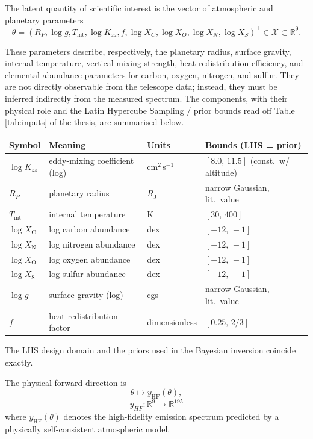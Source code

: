 \documentclass[11pt,a4paper]{article}
\newcommand{\Rp}{R_{\!P}}
\newcommand{\logg}{\log g}
\newcommand{\Tint}{T_{\mathrm{int}}}
\newcommand{\Kzz}{\log K_{zz}}
\newcommand{\fhr}{f}
\newcommand{\XC}{\log X_{\mathrm{C}}}
\newcommand{\XO}{\log X_{\mathrm{O}}}
\newcommand{\XN}{\log X_{\mathrm{N}}}
\newcommand{\XS}{\log X_{\mathrm{S}}}
\begin{document}
The latent quantity of scientific interest is the vector of atmospheric and planetary parameters
\[
\theta
=
\left(
R_P,\log g,T_{\mathrm{int}},\log K_{zz},f,
\log X_C,\log X_O,\log X_N,\log X_S
\right)^\top
\in \mathcal{X}\subset \mathbb{R}^9.
\]
\label{sec:what}



These parameters describe, respectively, the planetary radius, surface gravity, internal temperature, vertical mixing strength, heat redistribution efficiency, and elemental abundance parameters for carbon, oxygen, nitrogen, and sulfur. They are not directly observable from the telescope data; instead, they must be inferred indirectly from the measured spectrum. The components, with their physical role and the Latin Hypercube Sampling / prior bounds
read off Table \ref{tab:inputs} of the thesis, are summarised below.


\begin{center}
\label{tab:inputs}
\begin{tabular}{@{}l l l l@{}}
\toprule
Symbol & Meaning & Units & Bounds (LHS = prior)\\
\midrule
$\Kzz$   & eddy-mixing coefficient (log) & cm$^{2}$\,s$^{-1}$ & $[8.0,\,11.5]$ (const.\ w/ altitude)\\
$\Rp$    & planetary radius              & $R_{\mathrm{J}}$   & narrow Gaussian, lit.\ value\\
$\Tint$  & internal temperature          & K                  & $[30,\,400]$\\
$\XC$    & log carbon abundance          & dex                & $[-12,\,-1]$\\
$\XN$    & log nitrogen abundance        & dex                & $[-12,\,-1]$\\
$\XO$    & log oxygen abundance          & dex                & $[-12,\,-1]$\\
$\XS$    & log sulfur abundance          & dex                & $[-12,\,-1]$\\
$\logg$  & surface gravity (log)         & cgs                & narrow Gaussian, lit.\ value\\
$\fhr$   & heat-redistribution factor    & dimensionless      & $[0.25,\,2/3]$\\
\bottomrule
\end{tabular}
\end{center}

The LHS design domain and the priors used in the Bayesian inversion
coincide exactly. 

The physical forward direction is
\[
\theta
\longmapsto
y_{\mathrm{HF}}(\theta),
\]
\begin{equation}
    \label{eq:ammotelodico}
    y_{HF}:\mathbb{R}^9\longrightarrow\mathbb{R}^{195}
\end{equation}
where \(y_{\mathrm{HF}}(\theta)\) denotes the high-fidelity emission spectrum predicted by a physically self-consistent atmospheric model. 
\end{document}
